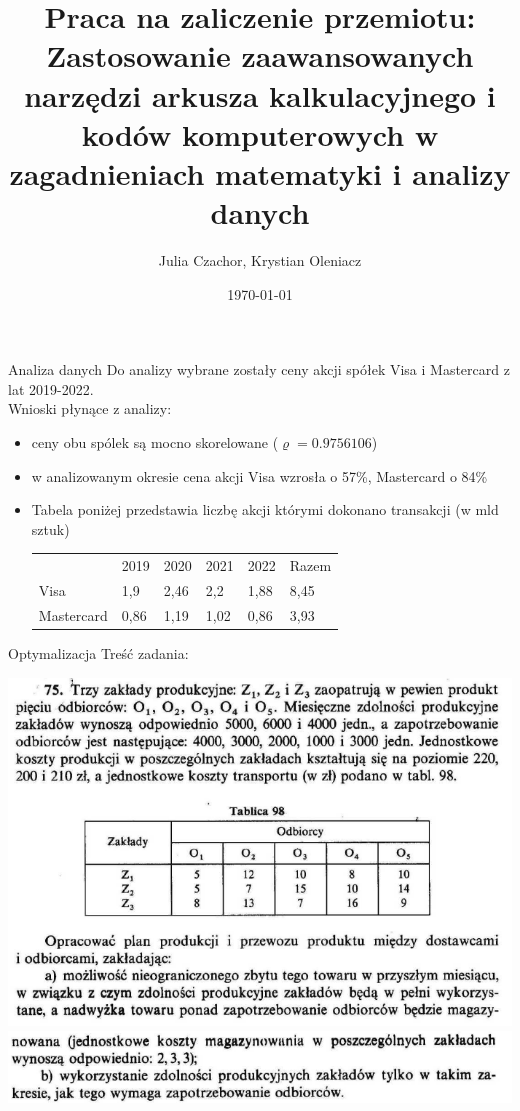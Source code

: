 \documentclass{beamer}
\title{Praca na zaliczenie przemiotu: Zastosowanie zaawansowanych narzędzi arkusza kalkulacyjnego i kodów komputerowych w zagadnieniach matematyki i analizy danych}
\date{\today}
\author{Julia Czachor, Krystian Oleniacz}
\begin{document}
  \maketitle
  \begin{frame}{Analiza danych}
    Do analizy wybrane zostały ceny akcji spółek Visa i Mastercard z lat 2019-2022. \\
    Wnioski płynące z analizy:
    \begin{itemize}
      \item ceny obu spólek są mocno skorelowane ($\varrho  =0.9756106$)
      \item w analizowanym okresie cena akcji Visa wzrosła o 57\%, Mastercard o 84\%
      \item Tabela poniżej przedstawia liczbę akcji którymi dokonano transakcji (w mld sztuk)
      \begin{table}[]
        \begin{tabular}{llllll}
                   & 2019 & 2020 & 2021 & 2022 & Razem \\
        Visa       & 1,9  & 2,46 & 2,2  & 1,88 & 8,45  \\
        Mastercard & 0,86 & 1,19 & 1,02 & 0,86 & 3,93 
        \end{tabular}
        \end{table}
    \end{itemize}


  \end{frame}
  \begin{frame}{Optymalizacja}
    Treść zadania:

    \includegraphics[scale=0.5]{images/obrazek1.png}
    \includegraphics[scale=0.5]{images/obrazek2.png}
  \end{frame}
\end{document}
